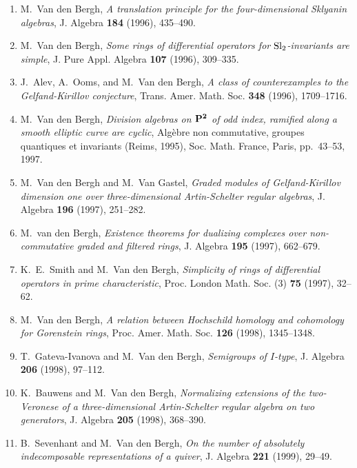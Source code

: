 \begin{enumerate}
\item
M.~Van den Bergh, {\em A translation principle for the four-dimensional Sklyanin algebras}, J. Algebra {\bf 184} (1996), 435--490.

\item
M.~Van den Bergh, {\em Some rings of differential operators for $\rm Sl\sb 2$-invariants are simple}, J. Pure Appl. Algebra {\bf 107} (1996), 309--335.

\item
J.~Alev, A.~Ooms, and M.~Van den Bergh, {\em A class of counterexamples to the Gelfand-Kirillov conjecture}, Trans. Amer. Math. Soc. {\bf 348} (1996), 1709--1716.

\item
M.~Van den Bergh, {\em Division algebras on $\bf P\sp 2$ of odd index, ramified along a smooth elliptic curve are cyclic}, Alg\`ebre non commutative, groupes quantiques et invariants (Reims, 1995), Soc. Math. France, Paris, pp.~43--53, 1997.

\item
M.~Van den Bergh and M.~Van Gastel, {\em Graded modules of Gelfand-Kirillov dimension one over three-dimensional Artin-Schelter regular algebras}, J. Algebra {\bf 196} (1997), 251--282.

\item
M.~van den Bergh, {\em Existence theorems for dualizing complexes over non-commutative graded and filtered rings}, J. Algebra {\bf 195} (1997), 662--679.

\item
K.~E.~Smith and M.~Van den Bergh, {\em Simplicity of rings of differential operators in prime characteristic}, Proc. London Math. Soc. (3) {\bf 75} (1997), 32--62.

\item
M.~Van den Bergh, {\em A relation between Hochschild homology and cohomology for Gorenstein rings}, Proc. Amer. Math. Soc. {\bf 126} (1998), 1345--1348.

\item
T.~Gateva-Ivanova and M.~Van den Bergh, {\em Semigroups of $I$-type}, J. Algebra {\bf 206} (1998), 97--112.

\item
K.~Bauwens and M.~Van den Bergh, {\em Normalizing extensions of the two-Veronese of a three-dimensional Artin-Schelter regular algebra on two generators}, J. Algebra {\bf 205} (1998), 368--390.

\item
B.~Sevenhant and M.~Van den Bergh, {\em On the number of absolutely indecomposable representations of a quiver}, J. Algebra {\bf 221} (1999), 29--49.


\end{enumerate}
